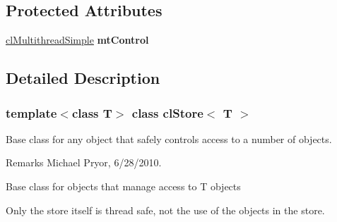 \subsection*{Protected Attributes}
\begin{DoxyCompactItemize}
\item 
\hypertarget{classcl_store_a4c365c86ada785f274033f2aeba94f30}{
\hyperlink{classcl_multithread_simple}{clMultithreadSimple} {\bfseries mtControl}}
\label{classcl_store_a4c365c86ada785f274033f2aeba94f30}

\end{DoxyCompactItemize}


\subsection{Detailed Description}
\subsubsection*{template$<$class T$>$ class clStore$<$ T $>$}

Base class for any object that safely controls access to a number of objects. \begin{DoxyRemark}{Remarks}
Michael Pryor, 6/28/2010.
\end{DoxyRemark}
Base class for objects that manage access to T objects \par
 Only the store itself is thread safe, not the use of the objects in the store. 

